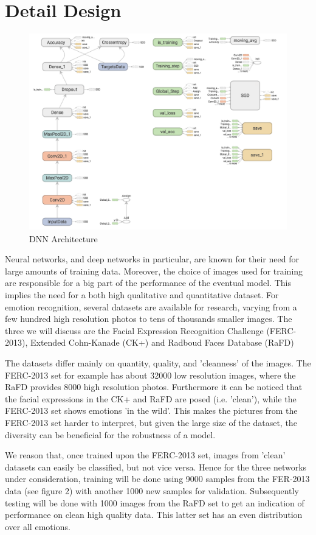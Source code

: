 \section{Detail Design}
\begin{figure}[h]
	\centering\includegraphics[scale=0.70]{images/graph.png}
	\caption{DNN Architecture}
\end{figure}

Neural networks, and deep networks in particular, are known for their need for large amounts of training data. Moreover, the choice of images used for training are responsible for a big part of the performance of the eventual model. This implies the need for a both high qualitative and quantitative dataset. For emotion recognition, several datasets are available for research, varying from a few hundred high resolution photos to tens of thousands smaller images. The three we will discuss are the Facial Expression Recognition Challenge (FERC-2013), Extended Cohn-Kanade (CK+) and Radboud Faces Database (RaFD)

The datasets differ mainly on quantity, quality, and ’cleanness’ of the images. The FERC-2013 set for example has about 32000 low resolution images, where the RaFD provides 8000 high resolution photos. Furthermore it can be noticed that the facial expressions in the CK+ and RaFD are posed (i.e. ’clean’), while the FERC-2013 set shows emotions ’in the wild’. This makes the pictures from the FERC-2013 set harder to interpret, but given the large size of the dataset, the diversity can be beneficial for the robustness of a model. 

We reason that, once trained upon the FERC-2013 set, images from ’clean’ datasets can easily be classiﬁed, but not vice versa. Hence for the three networks under consideration, training will be done using 9000 samples from the FER-2013 data (see ﬁgure 2) with another 1000 new samples for validation. Subsequently testing will be done with 1000 images from the RaFD set to get an indication of performance on clean high quality data. This latter set has an even distribution over all emotions.

